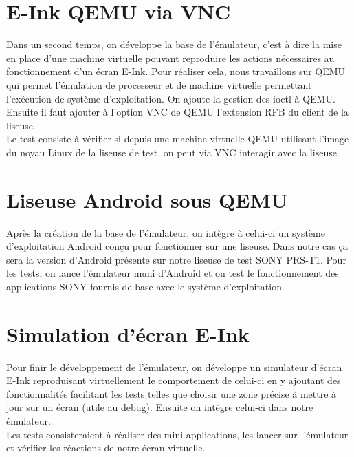 \newpage

\section{E-Ink QEMU via VNC}

Dans un second temps, on développe la base de l'émulateur, c'est à dire la mise en place d'une machine virtuelle pouvant reproduire les actions nécessaires au fonctionnement d'un écran E-Ink. Pour réaliser cela, nous travaillons sur QEMU qui permet l'émulation de processeur et de machine virtuelle permettant l'exécution de système d'exploitation. On ajoute la gestion des ioctl à QEMU. Ensuite il faut ajouter à l'option VNC de QEMU l'extension RFB du client de la liseuse.
\\Le test consiste à vérifier si depuis une machine virtuelle QEMU utilisant l'image du noyau Linux de la liseuse de test, on peut via VNC interagir avec la liseuse. 


\section{Liseuse Android sous QEMU}

Après la création de la base de l'émulateur, on intègre à celui-ci un système d'exploitation Android conçu pour fonctionner sur une liseuse. Dans notre cas ça sera la version d'Android présente sur notre liseuse de test SONY PRS-T1.
Pour les tests, on lance l'émulateur muni d'Android et on test le fonctionnement des applications SONY fournis de base avec le système d'exploitation.

\section{Simulation d'écran E-Ink}

Pour finir le développement de l'émulateur, on développe un simulateur d'écran E-Ink reproduisant virtuellement le comportement de celui-ci en y ajoutant des fonctionnalités facilitant les tests telles que choisir une zone précise à mettre à jour sur un écran (utile au debug). Ensuite on intègre celui-ci dans notre émulateur.
\\Les tests consisteraient à réaliser des mini-applications, les lancer sur l'émulateur et vérifier les réactions de notre écran virtuelle.

